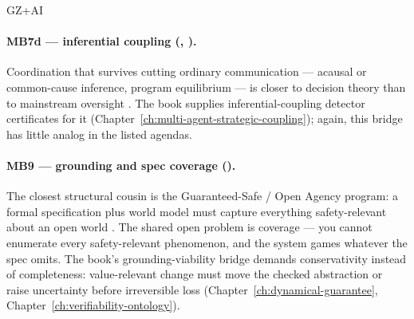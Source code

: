 \begin{authbar}{GZ+AI}
\paragraph{MB7d --- inferential coupling (, ).}
Coordination that survives cutting ordinary communication --- acausal or common-cause inference, program equilibrium --- is closer to decision theory than to mainstream oversight \autocite{fdt2017,tdt2010}.
The book supplies inferential-coupling detector certificates for it (Chapter~\ref{ch:multi-agent-strategic-coupling}); again, this bridge has little analog in the listed agendas.

\paragraph{MB9 --- grounding and spec coverage ().}
The closest structural cousin is the Guaranteed-Safe / Open Agency program: a formal specification plus world model must capture everything safety-relevant about an open world \autocite{dalrymple2024gsai}.
The shared open problem is coverage --- you cannot enumerate every safety-relevant phenomenon, and the system games whatever the spec omits.
The book's grounding-viability bridge demands conservativity instead of completeness: value-relevant change must move the checked abstraction or raise uncertainty before irreversible loss (Chapter~\ref{ch:dynamical-guarantee}, Chapter~\ref{ch:verifiability-ontology}).


\end{authbar}
